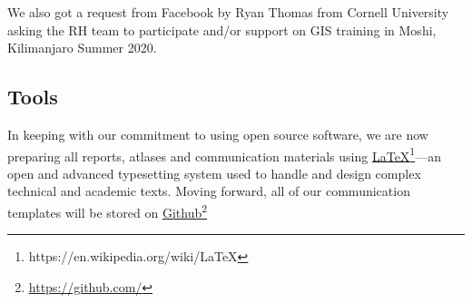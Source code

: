 \documentclass[a4paper,12pt,twoside]{article}
\begin{document}
We also got a request from Facebook by Ryan Thomas from Cornell University asking the RH team to participate and/or support on GIS training in Moshi, Kilimanjaro Summer 2020.

\subsection{Tools}
In keeping with our commitment to using open source software, we are now preparing all reports, atlases and communication materials using \href{https://en.wikipedia.org/wiki/LaTeX}{\LaTeX{}\footnote{\url{https://en.wikipedia.org/wiki/LaTeX}}}---an open and  advanced typesetting system used to handle and design complex technical and academic texts. Moving forward, all of our communication templates will be stored on \href{https://github.com/}{Github}\footnote{\url{https://github.com/}} 
\end{document}

